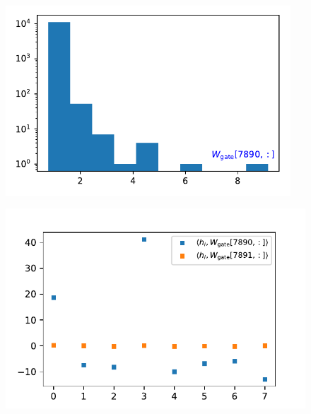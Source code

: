 \begin{figure}[H]
\centering
\begin{minipage}{.32\textwidth}
\centering
    \label{fig:w1-norm}
    \includegraphics[width=0.95\textwidth]{Figures/Summer/w1_norm_hist.pdf}
\end{minipage}
\begin{minipage}{.32\textwidth}
    \centering
    \label{fig:corr-w1}
    \includegraphics[width=.95\textwidth]{Figures/Summer/corr_with_w.pdf}
\end{minipage}

\end{figure}

